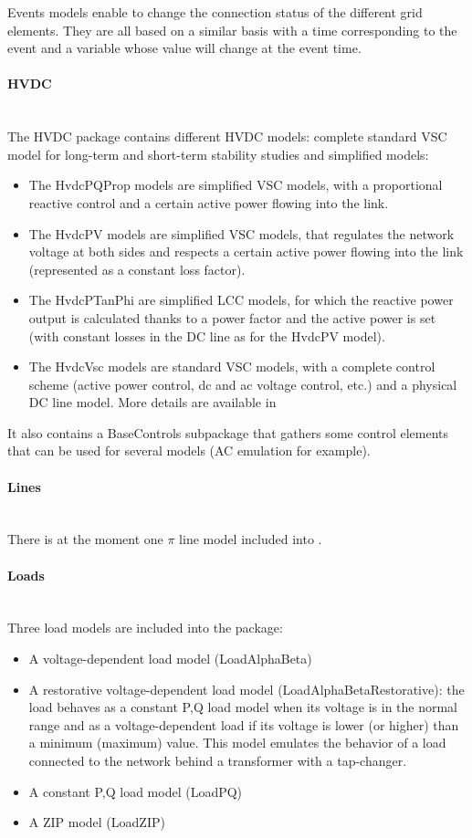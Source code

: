 \documentclass[a4paper, 12pt]{report}
\begin{document}
Events models enable to change the connection status of the different grid elements. They are all based on a similar basis with a time corresponding to the event and a variable whose value will change at the event time.

\paragraph{HVDC}
~~\\

The HVDC package contains different HVDC models: complete standard VSC model for long-term and short-term stability studies and simplified models:
\begin{itemize}
\item The HvdcPQProp models are simplified VSC models, with a proportional reactive control and a certain active power flowing into the link.
\item The HvdcPV models are simplified VSC models, that regulates the network voltage at both sides and respects a certain active power flowing into the link (represented as a constant loss factor).
\item The HvdcPTanPhi are simplified LCC models, for which the reactive power output is calculated thanks to a power factor and the active power is set (with constant losses in the DC line as for the HvdcPV model).
\item The HvdcVsc models are standard VSC models, with a complete control scheme (active power control, dc and ac voltage control, etc.) and a physical DC line model. More details are available in \cite{AverageHVDC}
\end{itemize}
It also contains a BaseControls subpackage that gathers some control elements that can be used for several models (AC emulation for example).

\paragraph{Lines}
~~\\

There is at the moment one $\pi$ line model included into \Dynawo.

\paragraph{Loads}
~~\\

Three load models are included into the package:
\begin{itemize}
\item A voltage-dependent load model (LoadAlphaBeta)
\item A restorative voltage-dependent load model (LoadAlphaBetaRestorative): the load behaves as a constant P,Q load model when its voltage is in the normal range and as a voltage-dependent load if its voltage is lower (or higher) than a minimum (maximum) value. This model emulates the behavior of a load connected to the network behind a transformer with a tap-changer.
\item A constant P,Q load  model (LoadPQ)
\item A ZIP model (LoadZIP)
\end{itemize}
\end{document}
